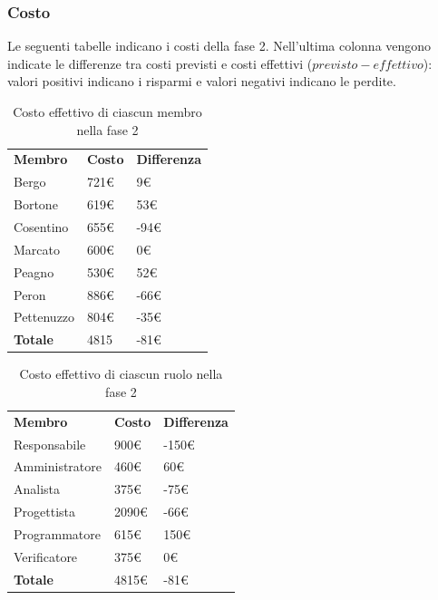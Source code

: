 	\subsubsection{Costo}
	Le seguenti tabelle indicano i costi della fase 2. Nell'ultima colonna vengono indicate le differenze tra costi previsti e costi effettivi ($previsto - effettivo$): valori positivi indicano i risparmi e valori negativi indicano le perdite.
		
	\begin{table}[H]
		\centering
		\begin{tabular}{| l | l | l |}
			\rowcolor{LightBlue}
			\textbf{\color{white}Membro}
			& \textbf{\color{white}Costo}
			& \textbf{\color{white}Differenza}\\
			Bergo		& 721€	& 9€\\
			Bortone		& 619€	& 53€\\
			Cosentino	& 655€	& -94€\\
			Marcato		& 600€	& 0€\\
			Peagno		& 530€	& 52€\\
			Peron		& 886€	& -66€\\
			Pettenuzzo	& 804€	& -35€\\ \hline
			\textbf{Totale} & 4815	& -81€\\ \hline
		\end{tabular}
		\caption{Costo effettivo di ciascun membro nella fase 2}	
	\end{table}
	
	\begin{table}[H]
		\centering
		\begin{tabular}{| l | l |l|}
			\rowcolor{LightBlue}
			\textbf{\color{white}Membro}
			& \textbf{\color{white}Costo}
			& \textbf{\color{white}Differenza}\\

			Responsabile	& 900€	& -150€\\
			Amministratore 	& 460€ 	& 60€\\
			Analista 		& 375€ 	& -75€\\
			Progettista 	& 2090€	& -66€\\
			Programmatore 	& 615€	& 150€\\
			Verificatore 	& 375€	& 0€\\ \hline
			\textbf{Totale} & 4815€	& -81€\\ \hline
		\end{tabular}
		\caption{Costo effettivo di ciascun ruolo nella fase 2}
	\end{table}
	
